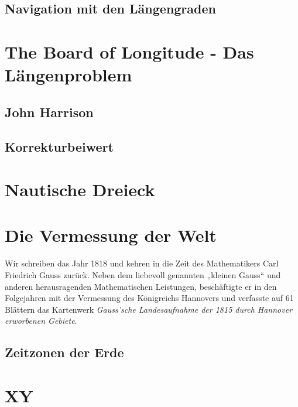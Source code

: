 \begin{refsection}
\subsection{Navigation mit den Längengraden}


\section{The Board of Longitude - Das Längenproblem}


\subsection{John Harrison}


\subsection{Korrekturbeiwert}


\section{Nautische Dreieck}







\section{Die Vermessung der Welt}
Wir schreiben das Jahr 1818 und kehren in die Zeit des Mathematikers Carl Friedrich Gauss zurück. Neben dem liebevoll genannten „kleinen Gauss“ und anderen herausragenden Mathematischen Leistungen, beschäftigte er in den Folgejahren mit der Vermessung des Königreichs Hannovers und verfasste auf 61 Blättern das Kartenwerk \textit{Gauss’sche Landesaufnahme der 1815 durch Hannover erworbenen Gebiete}.





\subsection{Zeitzonen der Erde}










\section{XY}




\end{refsection}
